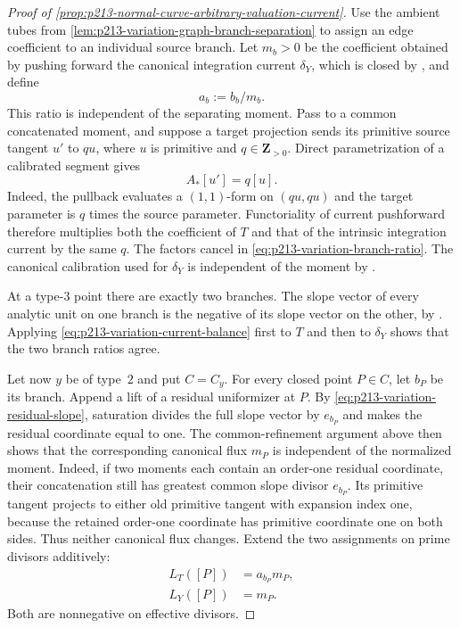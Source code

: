 \begin{proof}[Proof of
\cref{prop:p213-normal-curve-arbitrary-valuation-current}]
Use the ambient tubes from
\cref{lem:p213-variation-graph-branch-separation} to assign an edge
coefficient to an individual source branch.  Let $m_b>0$ be the
coefficient obtained by pushing forward the canonical integration current
$\delta_Y$, which is closed by \cite[§7.7.4]{CLD25}, and define
\begin{equation}
                             a_b:=b_b/m_b.
 \label{eq:p213-variation-branch-ratio}
\end{equation}
This ratio is independent of the separating moment.  Pass to a common
concatenated moment, and suppose a target projection sends its primitive
source tangent $u'$ to $q u$, where $u$ is primitive and
$q\in\mathbf Z_{>0}$.  Direct parametrization of a calibrated segment
gives
\begin{equation}
                       A_*[u']=q[u].
 \label{eq:p213-variation-segment-pushforward}
\end{equation}
Indeed, the pullback evaluates a $(1,1)$-form on $(qu,qu)$ and the target
parameter is $q$ times the source parameter.  Functoriality of current
pushforward \cite[§7.1.11]{CLD25} therefore multiplies both the coefficient
of $T$ and that of the intrinsic integration current by the same $q$.
The factors cancel in \eqref{eq:p213-variation-branch-ratio}.  The
canonical calibration used for $\delta_Y$ is independent of the moment by
\cite[§§14.3.1--14.3.5]{CLD25}.

At a type-$3$ point there are exactly two branches.  The slope vector of
every analytic unit on one branch is the negative of its slope vector on
the other, by \cite[Theorem~4.5.22]{Ducros24CurveStructure}.  Applying
\eqref{eq:p213-variation-current-balance} first to $T$ and then to
$\delta_Y$ shows that the two branch ratios agree.

Let now $y$ be of type~$2$ and put $C=C_y$.  For every closed point
$P\in C$, let $b_P$ be its branch.  Append a lift of a residual
uniformizer at $P$.  By
\eqref{eq:p213-variation-residual-slope}, saturation divides the full
slope vector by $e_{b_P}$ and makes the residual coordinate equal to one.
The common-refinement argument above then shows that the corresponding
canonical flux $m_P$ is independent of the normalized moment.  Indeed, if
two moments each contain an order-one residual coordinate, their
concatenation still has greatest common slope divisor $e_{b_P}$.  Its
primitive tangent projects to either old primitive tangent with expansion
index one, because the retained order-one coordinate has primitive
coordinate one on both sides.  Thus neither canonical flux changes.
Extend
the two assignments on prime divisors additively:
\begin{equation}
 \begin{split}
 L_T([P])&=a_{b_P}m_P,\\
 L_Y([P])&=m_P.
 \end{split}
 \label{eq:p213-variation-divisor-functionals}
\end{equation}
Both are nonnegative on effective divisors.


\end{proof}
